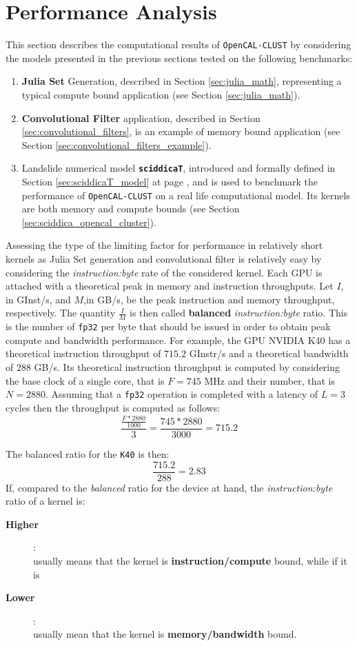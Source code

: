 \section{Performance Analysis}
\label{sec:perfomance}
This section describes the computational results of \texttt{OpenCAL-CLUST} by considering the models presented in the previous sections tested on the following benchmarks:
\begin{enumerate}
    \item \textbf{Julia Set} Generation, described in Section \ref{sec:julia_math}, representing a typical compute bound application (see Section \ref{sec:julia_math}).
    \item \textbf{Convolutional Filter} application, described in Section \ref{sec:convolutional_filters}, is an example of memory bound application (see Section \ref{sec:convolutional_filters_example}).
    \item Landslide numerical model \texttt{\textbf{sciddicaT}}, introduced and formally defined in Section \ref{sec:sciddicaT_model} at page \pageref{sec:sciddicaT_model}, and is used to benchmark the performance of \texttt{OpenCAL-CLUST} on a real life computational model. Its kernels are both memory and compute bounds (see Section \ref{sec:sciddica_opencal_cluster}).
\end{enumerate}
Assessing the type of the limiting factor for performance in relatively short kernels as Julia Set generation and convolutional filter is relatively easy by considering the \textit{instruction:byte} rate of the considered kernel.
Each GPU is attached with a theoretical peak in memory and instruction throughputs\cite{Volkov:EECS-2016-143}.
Let $I$, in \si{GInst/s}, and $M$,in \si{GB/s}, be the peak instruction and memory throughput, respectively. The quantity $\frac{I}{M}$ is then called \textbf{balanced} \textit{instruction:byte} ratio. This is the number of \texttt{fp32} per byte that should be issued in order to obtain peak compute and bandwidth performance.
For example, the GPU NVIDIA K40 has a theoretical instruction throughput of $715.2$ \si{GInstr/s} and a theoretical bandwidth of $288$ \si{GB/s}. 
Its theoretical instruction throughput is computed by considering the base clock of a single core, that is $F=745$ \si{MHz} and their number, that is $N=2880$. Assuming that a \texttt{fp32} operation is completed with a latency of $L=3$ cycles then the throughput is computed as follows:
\[
    \frac{\frac{F*2880}{1000}}{3} = \frac{745*2880}{3000} = 715.2
\]

The balanced ratio for the \texttt{K40} is then:\[\frac{715.2}{288} = 2.83\]
If, compared to the \textit{balanced} ratio for the device at hand, the \textit{instruction:byte} ratio of a kernel is: 
\begin{description}
    \item[\textbf{Higher}]:\\usually means that the kernel is \textbf{instruction/compute} bound, while if it is
    \item[\textbf{Lower}]:\\usually mean that the kernel is \textbf{memory/bandwidth} bound.
\end{description}

